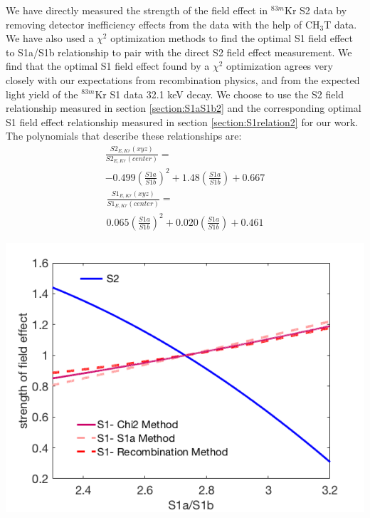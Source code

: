 We have directly measured the strength of the field effect in $^{83m}$Kr S2 data by removing detector inefficiency effects from the data with the help of CH$_3$T data.  We have also used a $\chi^2$ optimization methods to find the optimal S1 field effect to S1a/S1b relationship to pair with the direct S2 field effect measurement.  We find that the optimal S1 field effect found by a $\chi^2$ optimization agrees very closely with our expectations from recombination physics, and from the expected light yield of the $^{83m}$Kr S1 data 32.1 keV decay.   We choose to use the S2 field relationship measured in section \ref{section:S1aS1b2} and the corresponding optimal S1 field effect relationship measured in section \ref{section:S1relation2} for our work.  The polynomials that describe these relationships are:
\begin{multline}
\frac{S2_{E,Kr}(xyz)}{S2_{E,Kr}(center)} =   \\ -0.499 \left(\frac{S1a}{S1b} \right)^2 + 1.48  \left(\frac{S1a}{S1b} \right) + 0.667
\end{multline}
\begin{multline}
\frac{S1_{E,Kr}(xyz)}{S1_{E,Kr}(center)} = \\  0.065 \left(\frac{S1a}{S1b} \right)^2 + 0.020 \left(\frac{S1a}{S1b} \right) + 0.461
\end{multline}


\begin{center}
\includegraphics[scale=0.4]{figures/Fig7.png}
 \label{AllMeasurements}
\end{center}


